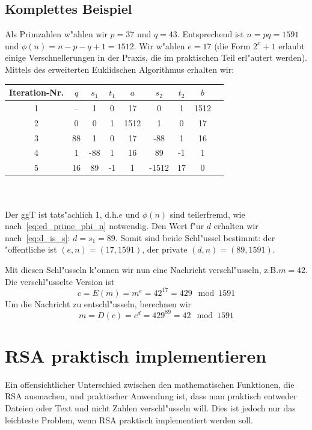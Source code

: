 \documentclass[12pt]{article}
\begin{document}
\subsection{Komplettes Beispiel}
\label{subsec:math:example}

Als Primzahlen w"ahlen wir $p = 37$ und $q = 43$.
Entsprechend ist $n = pq = 1591$ und $\phi(n) = n - p - q + 1 = 1512$.
Wir w"ahlen $e = 17$ (die Form $2^x+1$ erlaubt einige Verschnellerungen in der Praxis, die im praktischen Teil erl"autert werden).
Mittels des erweiterten Euklidschen Algorithmus erhalten wir:\\

\begin{tabular}{c|c c c c c c c l}
    Iteration-Nr. & $q$ & $s_1$ & $t_1$ & $a$ & $s_2$ & $t_2$ & $b$ \\
    \hline
    1 & -- & 1 & 0 & 17 & 0 & 1 & 1512 \\
    2 & 0 & 0 & 1 & 1512 & 1 & 0 & 17 \\
    3 & 88 & 1 & 0 & 17 & -88 & 1 & 16 \\
    4 & 1 & -88 & 1 & 16 & 89 & -1 & 1 \\
    5 & 16 & 89 & -1 & 1 & -1512 & 17 & 0 \\
\end{tabular}
~\\~\\
\noindent
Der ggT ist tats"achlich 1, d.h.\@ $e$ und $\phi(n)$ sind teilerfremd, wie nach~\eqref{eq:ed_prime_phi_n} notwendig.
Den Wert f"ur $d$ erhalten wir nach~\eqref{eq:d_is_s}: $d = s_1 = 89$.
Somit sind beide Schl"ussel be\-stimmt: der "offentliche ist $(e, n) = (17, 1591)$, der private $(d, n) = (89, 1591)$.

Mit diesen Schl"usseln k"onnen wir nun eine Nachricht verschl"usseln, z.B.\@ $m = 42$.
Die verschl"usselte Version ist \[c = E(m) = m^e = 42^{17} = 429 \mod 1591\]
Um die Nachricht zu entschl"usseln, berechnen wir
\[m = D(c) = c^d = 429^{89} = 42 \mod 1591\]

\section{RSA praktisch implementieren}

Ein offensichtlicher Unterschied zwischen den mathematischen Funktionen,
die RSA ausmachen, und praktischer Anwendung ist, dass man praktisch entweder Dateien
oder Text und nicht Zahlen verschl"usseln will.
Dies ist jedoch nur das leichteste Problem, wenn RSA praktisch implementiert werden soll.
\end{document}
